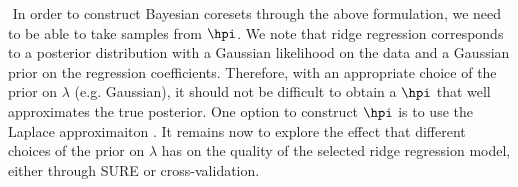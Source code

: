 $ $\newline
In order to construct Bayesian coresets through the above formulation, we need to be able to take samples from $\hpi$. We note that ridge regression corresponds to a posterior distribution with a Gaussian likelihood on the data and a Gaussian prior on the regression coefficients. Therefore, with an appropriate choice of the prior on $\lambda$ (e.g. Gaussian), it should not be difficult to obtain a $\hpi$ that well approximates the true posterior. One option to construct $\hpi$ is to use the Laplace approximaiton \citep{bishop2006pattern}. It remains now to explore the effect that different choices of the prior on $\lambda$ has on the quality of the selected ridge regression model, either through SURE or cross-validation.

%
%
%



